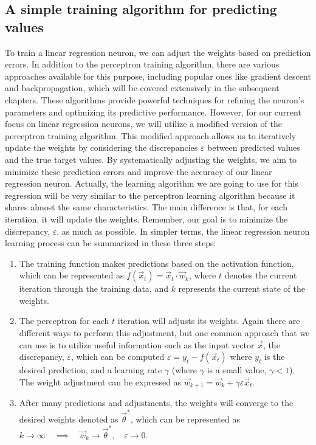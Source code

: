 \subsection{A simple training algorithm for predicting values}
To train a linear regression neuron, we can adjust the weights based on prediction errors.
In addition to the perceptron training algorithm, there are various approaches available for this purpose,
including popular ones like gradient descent and backpropagation, which will be covered extensively in the
subsequent chapters. These algorithms provide powerful techniques for refining the neuron's parameters and
optimizing its predictive performance. However, for our current focus on linear regression neurons, we will
utilize a modified version of the perceptron training algorithm. This modified approach allows us to
iteratively update the weights by considering the discrepancies $\varepsilon$ between predicted values and
the true target
values. By systematically adjusting the weights, we aim to minimize these prediction errors and improve the
accuracy of our linear regression neuron.
Actually, the learning algorithm we are going to use for this regression will be very similar to
the perceptron learning algorithm because
it shares almost the same characteristics. The main difference is that, for each iteration, it will update
the weights. Remember, our goal is to minimize the discrepancy, $\varepsilon$, as much as possible.
In simpler terms, the linear regression neuron learning process can be summarized in these three steps:
\begin{enumerate}
\item The training function makes predictions based on the activation function, which can be represented
  as $f(\vec{x}_t) = \vec{x}_t \cdot \vec{w}_k$, where $t$ denotes the current iteration through the training
  data, and $k$ represents the current state of the weights.

\item The perceptron for each $t$ iteration will adjusts its weights. Again there are different
  ways to perform this
  adjustment, but one common approach that we can use is to utilize useful information such as the input
  vector $\vec{x}$,
  the discrepancy, $\varepsilon$, which can be computed $\varepsilon = y_t - f(\vec{x}_t)$  where $y_t$ is the
  desired prediction,
  and a learning rate $\gamma$ (where $\gamma$ is a small value, $\gamma < 1$).
  The weight adjustment can be expressed as $\vec{w}_{k+1} = \vec{w}_k + \gamma \varepsilon \vec{x}_t$.

\item After many predictions and adjustments, the weights will converge to the desired weights denoted as
  $\vec{\theta}^*$, which can be represented as
  $k \rightarrow \infty \quad \implies \quad \vec{w}_k \rightarrow \vec{\theta}^*
  ,\quad \varepsilon \rightarrow 0$.
\end{enumerate}

